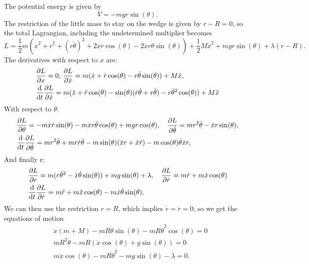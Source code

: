 \documentclass{article}
\begin{document}
        The potential energy is given by
        \begin{equation*}
            V = -m g r \sin(\theta).
        \end{equation*}
        The restriction of the little mass to stay on the wedge is given by $r - R = 0$, so the total Lagrangian, including the undetermined multiplier becomes
        \begin{equation*}
            L = \frac{1}{2}m \left(\dot x^2 + \dot r^2 + (r \dot \theta)^2+ 2 \dot x \dot r \cos(\theta) - 2 \dot x r \dot \theta \sin(\theta) \right) + \frac{1}{2}M \dot x^2 + mgr\sin(\theta) + \lambda(r - R).
        \end{equation*}
        The derivatives with respect to $x$ are:
        \begin{align*}
            &\pdv{L}{x} = 0, \, \pdv{L}{\dot x} = m (\dot x +  \dot r \cos(\theta) -  r \dot \theta \sin(\theta)) + M \dot x, \\
            &\dv{t}\pdv{L}{\dot x} = m(\ddot x + \ddot r \cos(\theta) - \sin(\theta)(\dot r \dot \theta + r \ddot \theta) -  r \dot \theta^2 \cos(\theta)) + M \ddot x
        \end{align*}
        With respect to $\theta$:
        \begin{align*}
            & \pdv{L}{\theta} = - m \dot x \dot r \sin(\theta) - m \dot x r \dot \theta \cos(\theta) + m g r \cos(\theta), \quad  \pdv{L}{\dot \theta} = m r^2 \dot \theta -  \dot x r \sin(\theta), \\
            &\dv{t} \pdv{L}{\dot \theta} = m r^2 \ddot \theta + m r \dot r \dot \theta - m \sin(\theta)( \ddot x r + \dot x \dot r) -  m \cos(\theta) \dot \theta \dot x r,
        \end{align*}
        And finally r:
        \begin{align*}
            & \pdv{L}{r} = m(r \dot \theta^2 - \dot x \dot \theta \sin(\theta)) + m g \sin(\theta) + \lambda, \quad 
            \pdv{L}{\dot r} = m \dot r + m \dot x \cos(\theta)  \\
            & \dv{t} \pdv{L}{\dot r} = m \ddot r + m \ddot x \cos(\theta) - m \dot x \dot \theta \sin(\theta).
        \end{align*}
        We can then use the restriction $r = R$, which implies $\dot r = \ddot r = 0$, so we get the equations of motion
        \begin{align*}
            & \ddot x(m + M) - m R \ddot \theta \sin(\theta) - m R \dot \theta^2 \cos(\theta) = 0 \\
            & mR^2 \ddot \theta - mR (\ddot x \cos(\theta) + g\sin(\theta)) = 0 \\
            & m \ddot x \cos(\theta) - m R \dot \theta^2 - m g \sin(\theta) - \lambda = 0.
        \end{align*}
\end{document}
